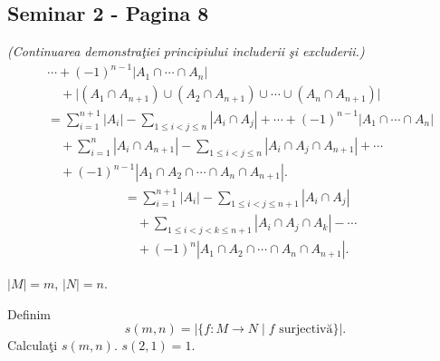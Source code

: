 
\subsection*{Seminar 2 - Pagina 8}

\noindent\textit{(Continuarea demonstraţiei principiului includerii şi excluderii.)}
\[
\begin{aligned}
&\cdots+(-1)^{n-1}\bigl|A_1\cap\cdots\cap A_n\bigr|\\
&\quad+\bigl|(A_1\cap A_{n+1})\cup(A_2\cap A_{n+1})
    \cup\cdots\cup(A_n\cap A_{n+1})\bigr|\\
&=\sum_{i=1}^{n+1}|A_i|
  -\sum_{1\leq i<j\leq n}|A_i\cap A_j|
  +\cdots+(-1)^{n-1}|A_1\cap\cdots\cap A_n|\\
&\quad+\sum_{i=1}^{n}|A_i\cap A_{n+1}|
  -\sum_{1\leq i<j\leq n}|A_i\cap A_j\cap A_{n+1}|
  +\cdots\\
&\quad+(-1)^{n-1}|A_1\cap A_2\cap\cdots\cap A_n\cap A_{n+1}|.
\end{aligned}
\]
\[
\begin{aligned}
&=\sum_{i=1}^{n+1}|A_i|
  -\sum_{1\leq i<j\leq n+1}|A_i\cap A_j|\\
&\quad+\sum_{1\leq i<j<k\leq n+1}|A_i\cap A_j\cap A_k|
  -\cdots\\
&\quad+(-1)^n|A_1\cap A_2\cap\cdots\cap A_n\cap A_{n+1}|.
\end{aligned}
\]

\bigskip
\noindent{}\quad $|M|=m$, $|N|=n$.

\noindent Definim
\[
 s(m,n)=\bigl|\{f:M\longrightarrow N\mid f\text{ surjectivă}\}\bigr|.
\]
\noindent Calculaţi $s(m,n)$. \hfill $s(2,1)=1$.

